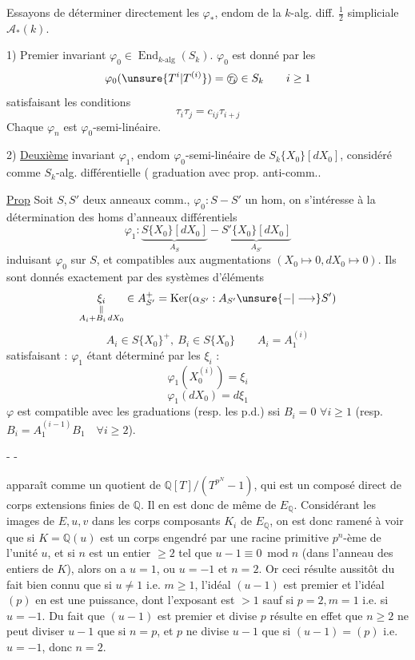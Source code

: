 Essayons de déterminer directement les $\varphi_*$, endom de la $k$-alg. diff. $\frac12$ simpliciale $\mathcal A_*(k)$.

1) Premier invariant $\varphi_0\in\operatorname{End}_{k\text{-alg}}(S_k)$.
 $\varphi_0$ est donné par les
\[
\varphi_0(\unsure{T^i|T^{(i)}})=\text{\textcircled{$\tau_i$}}\in S_k\qquad i\geq1
\]
satisfaisant les conditions
\[
\boxed{\tau_i\tau_j=c_{ij}\tau_{i+j}}
\]
Chaque $\varphi_n$ est $\varphi_0$-semi-linéaire.

2) \uline{Deuxième} invariant $\varphi_1$, endom $\varphi_0$-semi-linéaire de $S_k\{X_0\}[dX_0]$, considéré comme $S_k$-alg. différentielle ( graduation avec prop. anti-comm.\unsure{)}.

\uline{Prop} Soit $S,S'$ deux anneaux comm., $\varphi_0:S-S'$ un hom, on s'intéresse à la détermination des homs d'anneaux différentiels
\[
\varphi_1:\underbrace{S\{X_0\}[dX_0]}_{A_S}-\underbrace{S'\{X_0\}[dX_0]}_{A_{S'}}
\]
induisant $\varphi_0$ sur $S$, et compatibles aux augmentations $(X_0\longmapsto0,dX_0\longmapsto0)$. Ils sont donnés exactement par des systèmes d'éléments
\[
\underset{\substack{\Vert\\A_i+B_i\,dX_0}}{\xi_i}\in A_{S'}^+=\operatorname{Ker}(\alpha_{S'}:A_{S'}\unsure{-|\longrightarrow}S')
\]
\[
A_i\in S\{X_0\}^+,\ B_i\in S\{X_0\}\qquad A_i=A_1^{(i)}
\]
satisfaisant :
$\varphi_1$ étant déterminé par les $\xi_i$  :
\[
\varphi_1(X_0^{(i)})=\xi_i
\]
\[
\varphi_1(dX_0)=d\xi_1
\]
$\varphi$ est compatible avec les graduations (resp. les p.d.) ssi $B_i=0$ $\forall i\geq1$ (resp. $B_i=A_1^{(i-1)}B_1\quad\forall i\geq2$).

\begin{center}-  -\end{center}

apparaît comme un quotient de $\mathbb Q[T]/(T^{p^N}-1)$, qui est un composé direct de corps extensions finies de $\mathbb Q$. Il en est donc de même de $E_{\mathbb Q}$. Considérant les images de $E,u,v$ dans les corps composants $K_i$ de $E_{\mathbb Q}$, on est donc ramené à voir que si $K=\mathbb Q(u)$ est un corps engendré par une racine primitive $p^n$-ème de l'unité $u$, et si $n$ est un entier $\geq2$ tel que $u-1\equiv0\ \operatorname{mod}n$ (dans l'anneau des entiers de $K$), alors on a $u=1$, ou $u=-1$ et $n=2$. Or ceci résulte aussitôt du fait bien connu que si $u\neq1$ i.e. $m\geq1$, l'idéal $(u-1)$ est premier et l'idéal $(p)$ en est une puissance, dont l'exposant est $>1$ sauf si $p=2,m=1$ i.e. si $u=-1$. Du fait que $(u-1)$ est premier et divise $p$ résulte en effet que $n\geq2$ ne peut diviser $u-1$ que si $n=p$, et $p$ ne divise $u-1$ que si $(u-1)=(p)$ i.e. $u=-1$, donc $n=2$.

